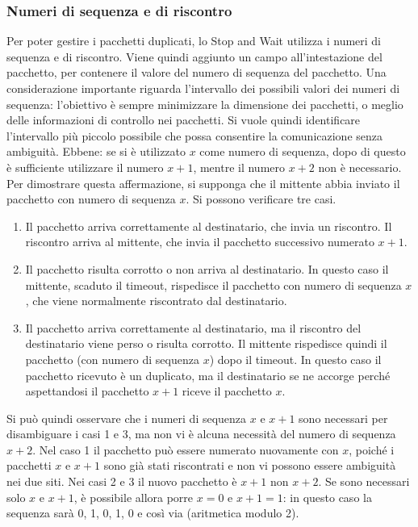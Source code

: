 \subsubsection*{Numeri di sequenza e di riscontro}
Per poter gestire i pacchetti duplicati, lo Stop and Wait utilizza i numeri di sequenza e di riscontro. Viene quindi aggiunto un campo all'intestazione del pacchetto, per contenere il valore del numero di sequenza del pacchetto. Una considerazione importante riguarda l'intervallo dei possibili valori dei numeri di sequenza: l'obiettivo è sempre minimizzare la dimensione dei pacchetti, o meglio delle informazioni di controllo nei pacchetti. Si vuole quindi identificare l'intervallo più piccolo possibile che possa consentire la comunicazione senza ambiguità. Ebbene: se si è utilizzato $x$ come numero di sequenza, dopo di questo è sufficiente utilizzare il numero $x+1$, mentre il numero $x+2$ non è necessario. Per dimostrare questa affermazione, si supponga che il mittente abbia inviato il pacchetto con numero di sequenza $x$. Si possono verificare tre casi.
\begin{enumerate}
    \item Il pacchetto arriva correttamente al destinatario, che invia un riscontro. Il riscontro arriva al mittente, che invia il pacchetto successivo numerato $x+1$.
    \item Il pacchetto risulta corrotto o non arriva al destinatario. In questo caso il mittente, scaduto il timeout, rispedisce il pacchetto con numero di sequenza $x$, che viene normalmente riscontrato dal destinatario.
    \item Il pacchetto arriva correttamente al destinatario, ma il riscontro del destinatario viene perso o risulta corrotto. Il mittente rispedisce quindi il pacchetto (con numero di sequenza $x$) dopo il timeout. In questo caso il pacchetto ricevuto è un duplicato, ma il destinatario se ne accorge perché aspettandosi il pacchetto $x+1$ riceve il pacchetto $x$.
\end{enumerate}

Si può quindi osservare che i numeri di sequenza $x$ e $x+1$ sono necessari per disambiguare i casi 1 e 3, ma non vi è alcuna necessità del numero di sequenza $x+2$. Nel caso 1 il pacchetto può essere numerato nuovamente con $x$, poiché i pacchetti $x$ e $x+1$ sono già stati riscontrati e non vi possono essere ambiguità nei due siti. Nei casi 2 e 3 il nuovo pacchetto è $x+1$ non $x+2$. Se sono necessari solo $x$ e $x+1$, è possibile allora porre $x=0$ e $x+1=1$: in questo caso la sequenza sarà 0, 1, 0, 1, 0 e così via (aritmetica modulo 2).

